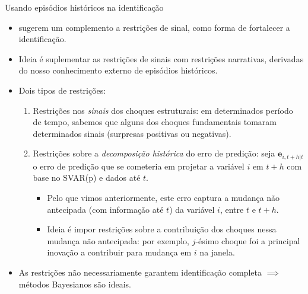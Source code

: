 \documentclass[11pt]{beamer}
\begin{document}
\begin{frame}{Usando episódios históricos na identificação}
\begin{itemize}
	\item \citet{antolin2018} sugerem um complemento a restrições de sinal, como forma de fortalecer a identificação.
	\item Ideia é suplementar as restrições de sinais com {\color{blue}restrições narrativas}, derivadas do nosso conhecimento externo de episódios históricos.
	\item Dois tipos de restrições:
	\begin{enumerate}
		\item Restrições nos \emph{sinais} dos choques estruturais: em determinados período de tempo, sabemos que alguns dos choques fundamentais tomaram determinados sinais (surpresas positivas ou negativas).
		\item Restrições sobre a \emph{decomposição histórica} do erro de predição: seja $\boldsymbol{e}_{i,t+h|t}$ o erro de predição que se cometeria em projetar a variável $i$ em $t+h$ com base no SVAR(p) e dados até $t$. 
		\begin{itemize}
			\item 		Pelo que vimos anteriormente, este erro captura a mudança não antecipada (com informação até $t$) da variável $i$, entre $t$ e $t+h$.
			\item Ideia é impor restrições sobre a contribuição dos choques nessa mudança não antecipada: por exemplo, $j$-ésimo choque foi a principal inovação a contribuir para mudança em $i$ na janela.
		\end{itemize}
	\end{enumerate}
			\item As restrições não necessariamente garantem identificação completa $\implies$ métodos Bayesianos são ideais.
\end{itemize}
\end{frame}
\end{document}
